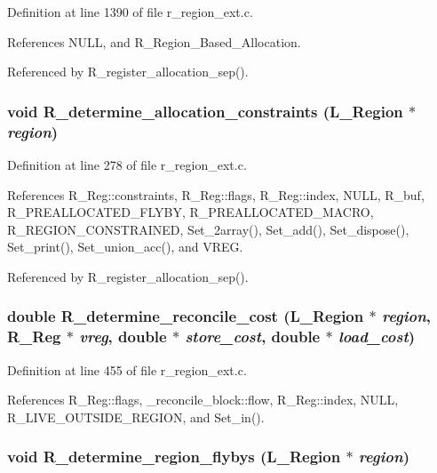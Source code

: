 Definition at line 1390 of file r\_\-region\_\-ext.c.

References NULL, and R\_\-Region\_\-Based\_\-Allocation.

Referenced by R\_\-register\_\-allocation\_\-sep().
\subsubsection{\setlength{\rightskip}{0pt plus 5cm}void R\_\-determine\_\-allocation\_\-constraints (L\_\-Region $\ast$ {\em region})}\label{r__region__ext_8c_ec5de6779afaf6c23006d8a5363992dc}




Definition at line 278 of file r\_\-region\_\-ext.c.

References R\_\-Reg::constraints, R\_\-Reg::flags, R\_\-Reg::index, NULL, R\_\-buf, R\_\-PREALLOCATED\_\-FLYBY, R\_\-PREALLOCATED\_\-MACRO, R\_\-REGION\_\-CONSTRAINED, Set\_\-2array(), Set\_\-add(), Set\_\-dispose(), Set\_\-print(), Set\_\-union\_\-acc(), and VREG.

Referenced by R\_\-register\_\-allocation\_\-sep().
\subsubsection{\setlength{\rightskip}{0pt plus 5cm}double R\_\-determine\_\-reconcile\_\-cost (L\_\-Region $\ast$ {\em region}, \bf{R\_\-Reg} $\ast$ {\em vreg}, double $\ast$ {\em store\_\-cost}, double $\ast$ {\em load\_\-cost})}\label{r__region__ext_8c_f172397e4692dd5aaf09176d9b494c47}




Definition at line 455 of file r\_\-region\_\-ext.c.

References R\_\-Reg::flags, \_\-reconcile\_\-block::flow, R\_\-Reg::index, NULL, R\_\-LIVE\_\-OUTSIDE\_\-REGION, and Set\_\-in().
\subsubsection{\setlength{\rightskip}{0pt plus 5cm}void R\_\-determine\_\-region\_\-flybys (L\_\-Region $\ast$ {\em region})}\label{r__region__ext_8c_7d403e367bc00ac823a0a624fe83c60b}




